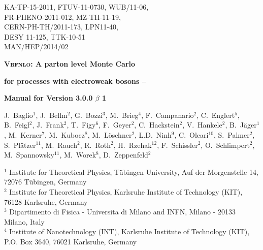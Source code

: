 \documentclass[english,12pt]{article}
\begin{document}
\begin{titlepage}
{\begin{flushright}{
 \begin{minipage}{8.5cm}
  KA-TP-15-2011,  FTUV-11-0730,  WUB/11-06, \\ 
  FR-PHENO-2011-012,  MZ-TH-11-19, \\ 
  CERN-PH-TH/2011-173,  LPN11-40, \\ 
  DESY 11-125,  TTK-10-51 \\
  MAN/HEP/2014/02
\end{minipage}}\end{flushright}}
\vspace{1cm}
\begin{center} {\Large \bf \textsc{Vbfnlo}: A parton level Monte Carlo
    } 
\end{center}
\begin{center}
 {\Large \bf  for processes with electroweak bosons --}
\end{center}
\begin{center}
 {\Large \bf  Manual for Version 3.0.0 $\beta$ 1}
\end{center}
\vspace{0.6cm}
\begin{center}
{\renewcommand{\baselinestretch}{4}
J.~Baglio$^{1}$, J.~Bellm$^{2}$, G.~Bozzi$^{3}$,
M.~Brieg$^{4}$, F.~Campanario$^{2}$, C.~Englert$^{5}$, B.~Feigl$^{2}$,
J.~Frank$^{2}$, T.~Figy$^{6}$, F.~Geyer$^{2}$, C.~Hackstein$^{2}$,
V.~Hankele$^{2}$, B.~J\"ager$^{1}$, M.~Kerner$^{7}$,
M.~Kubocz$^{8}$, M.~L\"oschner$^{2}$,
L.D.~Ninh$^{9}$, C.~Oleari$^{10}$, S.~Palmer$^{2}$,
S.~Pl\"atzer$^{11}$, M.~Rauch$^{2}$, R.~Roth$^{2}$, H.~Rzehak$^{12}$,
F.~Schissler$^{2}$, O.~Schlimpert$^{2}$, M.~Spannowsky$^{11}$,
M.~Worek$^{8}$, D.~Zeppenfeld$^{2}$
}
\end{center}
\vspace{0.4cm}
\begin{center}
$^{1}$ Institute for Theoretical Physics, T\"{u}bingen University, Auf der Morgenstelle 14, 72076 T\"{u}bingen, Germany \\ \noindent
$^{2}$ Institute for Theoretical Physics, Karlsruhe Institute of Technology (KIT), 76128 Karlsruhe, Germany \\ \noindent
$^{3}$ Dipartimento di Fisica - Universita di Milano and INFN, Milano - 20133 Milano, Italy\\ \noindent
$^{4}$ Institute of Nanotechnology (INT), Karlsruhe Institute of Technology (KIT), P.O. Box 3640, 76021 Karlsruhe, Germany \\ \noindent

\end{center}
\end{titlepage}
\end{document}
